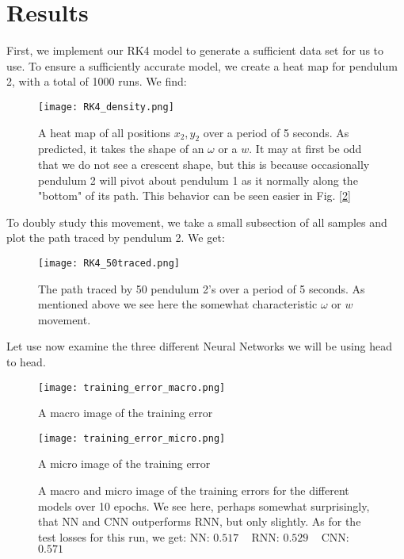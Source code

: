 \documentclass{article}
\begin{document}
\section{Results}
First, we implement our RK4 model to generate a sufficient data set for us to use. To ensure a sufficiently accurate model, we create a heat map for pendulum 2, with a total of 1000 runs. \newline We find:
\begin{figure}[ht!]
    \centering
    \texttt{[image: RK4\_density.png]}
    \caption{A heat map of all positions $x_2, y_2$ over a period of 5 seconds. As predicted, it takes the shape of an $\omega$ or a $w$. It may at first be odd that we do not see a crescent shape, but this is because occasionally pendulum 2 will pivot about pendulum 1 as it normally along the "bottom" of its path. This behavior can be seen easier in Fig. [\ref{figRK4T}]}
    \label{figRK4D}
\end{figure} \newline
To doubly study this movement, we take a small subsection of all samples and plot the path traced by pendulum 2. \newline We get:
\begin{figure}[ht!]
    \centering
    \texttt{[image: RK4\_50traced.png]}
    \caption{The path traced by 50 pendulum 2's over a period of 5 seconds. As mentioned above we see here the somewhat characteristic $\omega$ or $w$ movement.}
    \label{figRK4T}
\end{figure}
\newpage 
Let use now examine the three different Neural Networks we will be using head to head.
\begin{figure}[ht!]
    \centering
    
    \begin{minipage}{0.48\textwidth}
        \centering
        \texttt{[image: training\_error\_macro.png]}
        \caption{A macro image of the training error}
        \label{fig:macro_error}
    \end{minipage}\hfill
    \begin{minipage}{0.48\textwidth}
        \centering
        \texttt{[image: training\_error\_micro.png]}
        \caption{A micro image of the training error}
        \label{fig:micro_error}
    \end{minipage}
    \caption{A macro and micro image of the training errors for the different models over 10 epochs. We see here, perhaps somewhat surprisingly, that NN and CNN outperforms RNN, but only slightly. \newline
    As for the test losses for this run, we get:
    \newline NN: $0.517 \;\;\;$ RNN: $0.529 \;\;\;$ CNN: $0.571$ \newline} 
    \label{fig:training_errors}
\end{figure}
\end{document}
